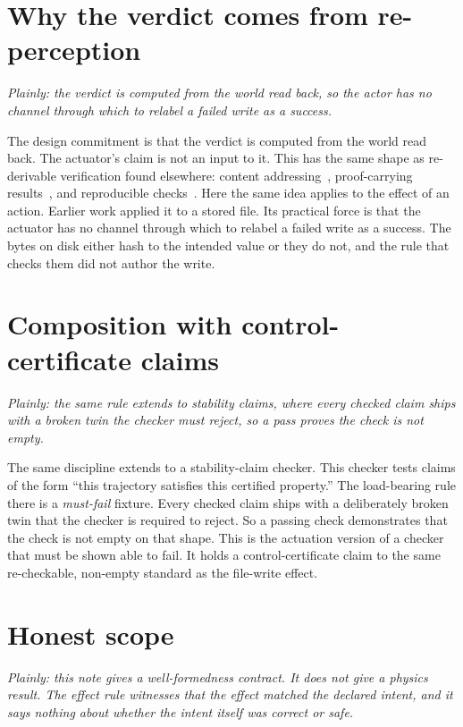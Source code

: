 \documentclass[11pt]{article}
\begin{document}
\section{Why the verdict comes from re-perception}
\emph{Plainly: the verdict is computed from the world read back, so the actor has no channel through which to relabel a failed write as a success.}

The design commitment is that the verdict is computed from the world read back. The actuator's claim is not an input to it. This has the same shape as re-derivable verification found elsewhere: content addressing~\cite{merkle}, proof-carrying results~\cite{pcc}, and reproducible checks~\cite{reproducible}. Here the same idea applies to the effect of an action. Earlier work applied it to a stored file. Its practical force is that the actuator has no channel through which to relabel a failed write as a success. The bytes on disk either hash to the intended value or they do not, and the rule that checks them did not author the write.

\section{Composition with control-certificate claims}
\emph{Plainly: the same rule extends to stability claims, where every checked claim ships with a broken twin the checker must reject, so a pass proves the check is not empty.}

The same discipline extends to a stability-claim checker. This checker tests claims of the form ``this trajectory satisfies this certified property.'' The load-bearing rule there is a \emph{must-fail} fixture. Every checked claim ships with a deliberately broken twin that the checker is required to reject. So a passing check demonstrates that the check is not empty on that shape. This is the actuation version of a checker that must be shown able to fail. It holds a control-certificate claim to the same re-checkable, non-empty standard as the file-write effect.

\section{Honest scope}
\emph{Plainly: this note gives a well-formedness contract. It does not give a physics result. The effect rule witnesses that the effect matched the declared intent, and it says nothing about whether the intent itself was correct or safe.}
\end{document}
